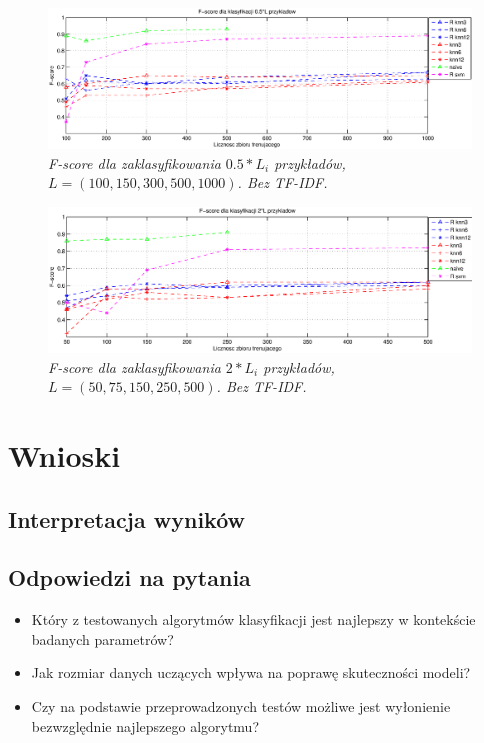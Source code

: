 \documentclass[a4paper, 10pt]{article}
\begin{document}
\begin{figure}[ht!]
\centering
\includegraphics[width=165mm]{wykresy/score1000-05.eps}
\caption{\it{F-score dla zaklasyfikowania $0.5*L_i$ przykładów, $L=(100,150,300,500,1000)$. Bez TF-IDF.}}
\label{overflow}
\end{figure}

\begin{figure}[ht!]
\centering
\includegraphics[width=165mm]{wykresy/score500-2.eps}
\caption{\it{F-score dla zaklasyfikowania $2*L_i$ przykładów, $L=(50,75,150,250,500)$. Bez TF-IDF.}}
\label{overflow}
\end{figure}

\FloatBarrier

\section{Wnioski}

\subsection{Interpretacja wyników}

\subsection{Odpowiedzi na pytania}
\begin{itemize}
\item{Który z testowanych algorytmów klasyfikacji jest najlepszy w kontekście badanych parametrów?}
\item{Jak rozmiar danych uczących wpływa na poprawę skuteczności modeli?}
\item{Czy na podstawie przeprowadzonych testów możliwe jest wyłonienie bezwzględnie najlepszego algorytmu?}
\end{itemize}





\nocite{*}

\end{document}
